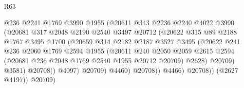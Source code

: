 \begin{lexlean}{R63}
\begin{coremodule}
                                  @236
                                  @2241
                                  @1769
                                  @3990
                                  @1955
                                  (@20611
                                    @343
                                    @2236
                                    @2240
                                    @4022
                                    @3990
                                    (@20681
                                      @317
                                      @2048
                                      @2190
                                      @2540
                                      @3497
                                      @20712
                                      (@20622
                                        @315
                                        @89
                                        @2188
                                        @1767
                                        @3495
                                        @1700
                                        (@20659
                                          @314
                                          @2182
                                          @2187
                                          @3527
                                          @3495
                                          (@20622
                                            @241
                                            @236
                                            @2060
                                            @1769
                                            @2594
                                            @1955
                                            (@20611
                                              @240
                                              @2050
                                              @2059
                                              @2615
                                              @2594
                                              (@20681 @236 @2048 @1769 @2540 @1955 @20712 @20709)
                                              @2628)
                                            @20709)
                                          @3581)
                                        @20708))
                                    @4097)
                                  @20709)
                                @4460)
                              @20708))
                          @4466)
                        @20708))
                    (@2627 @4197))
                  @20709)

\end{coremodule}
\end{lexlean}
